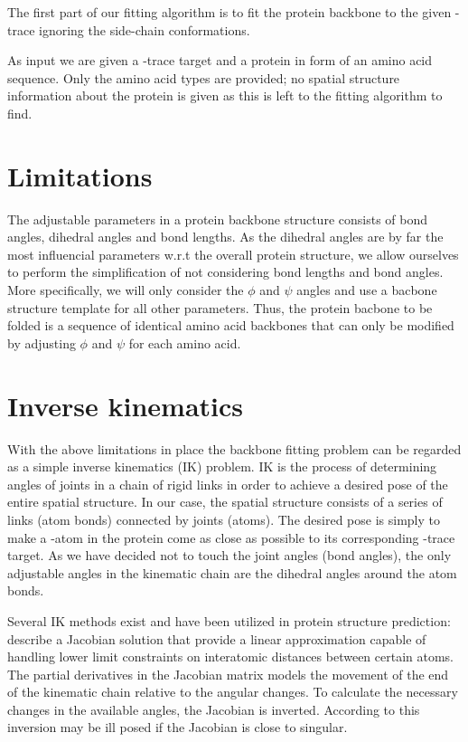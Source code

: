 The first part of our fitting algorithm is to fit the protein backbone to the given \Ca-trace ignoring the side-chain conformations.

As input we are given a \Ca-trace target and a protein in form of an amino acid sequence.
Only the amino acid types are provided; no spatial structure information about the protein is given as this is left to the fitting algorithm to find.


\section{Limitations}
The adjustable parameters in a protein backbone structure consists of bond angles, dihedral angles and bond lengths.
As the dihedral angles are by far the most influencial parameters w.r.t the overall protein structure, we allow ourselves to perform the simplification of not considering bond lengths and bond angles.
More specifically, we will only consider the $\phi$ and $\psi$ angles and use a bacbone structure template for all other parameters.
Thus, the protein bacbone to be folded is a sequence of identical amino acid backbones that can only be modified by adjusting $\phi$ and $\psi$ for each amino acid.


\section{Inverse kinematics}
With the above limitations in place the backbone fitting problem can be regarded as a simple inverse kinematics (IK) problem.
IK is the process of determining angles of joints in a chain of rigid links in order to achieve a desired pose of the entire spatial structure.
In our case, the spatial structure consists of a series of links (atom bonds) connected by joints (atoms).
The desired pose is simply to make a \Ca-atom in the protein come as close as possible to its corresponding \Ca-trace target.  
As we have decided not to touch the joint angles (bond angles), the only adjustable angles in the kinematic chain are the dihedral angles around the atom bonds.

Several IK methods exist and have been utilized in protein structure prediction:
\cite{shenkin1987} describe a Jacobian solution that provide a linear approximation capable of handling lower limit constraints on interatomic distances between certain atoms.
The partial derivatives in the Jacobian matrix models the movement of the end of the kinematic chain relative to the angular changes.
To calculate the necessary changes in the available angles, the Jacobian is inverted.
According to \cite{canutescu2003} this inversion may be ill posed if the Jacobian is close to singular.


